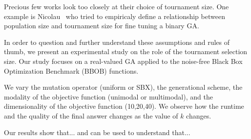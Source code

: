 
Precious few works look too closely at their choice of tournament
size. One example is Nicolau~\cite{nicolau2009application} who tried
to empiricaly define a relationship between population size and
tournament size for fine tuning a binary GA.

In order to question and further understand these assumptions and
rules of thumb, we present an experimental study on the role of the
tournament selection size. Our study focuses on a real-valued GA
applied to the noise-free Black Box Optimization Benchmark (BBOB)
functions.

We vary the mutation operator (uniform or SBX), the generational
scheme, the modality of the objective function (unimodal or
multimodal), and the dimensionality of the objective function
(10,20,40).  We observe how the runtime and the quality of the final
answer changes as the value of $k$ changes.

Our results show that... and can be used to understand that...

 
 
